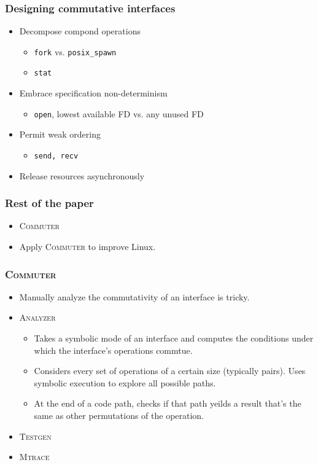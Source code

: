 \documentclass{beamer}
\begin{document}
\begin{frame}
\frametitle{Designing commutative interfaces}
\begin{itemize}
\item Decompose compond operations
\begin{itemize}
\item \texttt{fork} vs. \texttt{posix\_spawn}
\item \texttt{stat}
\end{itemize}
\item Embrace specification non-determinism
\begin{itemize}
\item \texttt{open}, lowest available FD vs. any unused FD
\end{itemize}
\item Permit weak ordering
\begin{itemize}
\item \texttt{send, recv}
\end{itemize}
\item Release resources asynchronously
\end{itemize}
\end{frame}

\begin{frame}
\frametitle{Rest of the paper}
\begin{itemize}
\item \textsc{Commuter}
\item Apply \textsc{Commuter} to improve Linux.
\end{itemize}
\end{frame}

\begin{frame}
\frametitle{\textsc{Commuter}}
\begin{itemize}
\item Manually analyze the commutativity of an interface is tricky.
\item \textsc{Analyzer}
\begin{itemize}
\item Takes a symbolic mode of an interface and computes the conditions under which
the interface's operations commtue.
\item Considers every set of operations of a certain size (typically pairs). 
Uses symbolic execution to explore all possible paths.
\item At the end of a code path, checks if that path yeilds a result that's the 
same as other permutations of the operation.
\end{itemize}
\item \textsc{Testgen}
\item \textsc{Mtrace}
\end{itemize}
\end{frame}
\end{document}

